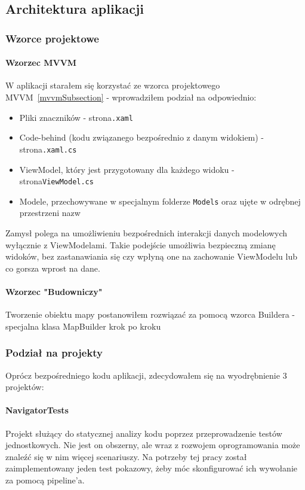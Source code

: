 \subsection{Architektura aplikacji}

\subsubsection{Wzorce projektowe}
\paragraph{Wzorzec MVVM}
W aplikacji starałem się korzystać ze wzorca projektowego MVVM~\ref{mvvmSubsection} - 
wprowadziłem podział na odpowiednio:
\begin{itemize}
    \item Pliki znaczników - strona\verb|.xaml|
    \item Code-behind (kodu związanego bezpośrednio z danym widokiem) - strona\verb|.xaml.cs|
    \item ViewModel, który jest przygotowany dla każdego widoku - strona\verb|ViewModel.cs|
    \item Modele, przechowywane w specjalnym folderze \verb|Models| oraz ujęte w odrębnej przestrzeni nazw
\end{itemize}

Zamysł polega na umożliwieniu bezpośrednich interakcji danych 
modelowych wyłącznie z ViewModelami. Takie podejście umożliwia bezpieczną zmianę 
widoków, bez zastanawiania się czy wpłyną one na zachowanie ViewModelu lub co gorsza wprost na dane.

\paragraph{Wzorzec "Budowniczy"}
Tworzenie obiektu mapy postanowiłem rozwiązać za pomocą wzorca Buildera - 
specjalna klasa MapBuilder krok po kroku 


\subsubsection{Podział na projekty}
Oprócz bezpośredniego kodu aplikacji, zdecydowałem się na wyodrębnienie 3 projektów:

\paragraph{NavigatorTests}
Projekt służący do statycznej analizy kodu poprzez przeprowadzenie testów jednostkowych.
Nie jest on obszerny, ale wraz z rozwojem oprogramowania może znaleźć się w nim więcej 
scenariuszy. Na potrzeby tej pracy został zaimplementowany jeden test pokazowy, 
żeby móc skonfigurować ich wywołanie za pomocą pipeline'a.

